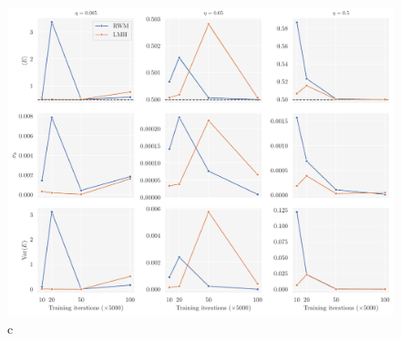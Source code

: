 \begin{figure}[!htb]
\begin{center}\includegraphics[width=\textwidth]{latex/figures/training_cycles_lr.pdf}
\end{center}
\caption{c}
\label{fig:train_iter_lr_batch5000}
\end{figure}

